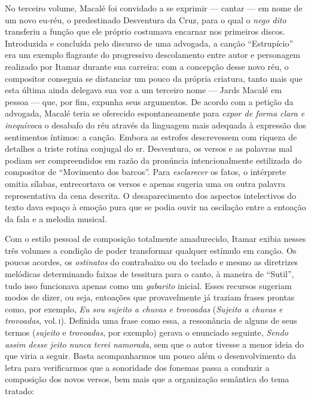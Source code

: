 No terceiro volume, Macalé foi convidado a se exprimir --- cantar --- em nome
de um novo eu-réu, o predestinado Desventura da Cruz, para o qual o \textit{nego
dito} transferiu a função que ele próprio costumava encarnar nos
primeiros discos. Introduzida e concluída pelo discurso de uma advogada,
a canção ``Estrupício'' era um exemplo flagrante do progressivo descolamento
entre autor e personagem realizado por Itamar durante sua carreira: com
a concepção desse novo réu, o compositor conseguia se distanciar um
pouco da própria criatura, tanto mais que esta última ainda delegava sua
voz a um terceiro nome --- Jards Macalé em pessoa --- que, por fim, expunha
seus argumentos. De acordo com a petição da advogada, Macalé teria se
oferecido espontaneamente para \textit{expor de forma clara e inequívoca} o
desabafo do réu através da linguagem mais adequada à expressão dos
sentimentos íntimos: a canção. Embora as estrofes descrevessem com
riqueza de detalhes a triste rotina conjugal do sr. Desventura, os
versos e as palavras mal podiam ser compreendidos em razão da pronúncia
intencionalmente estilizada do compositor de ``Movimento dos barcos''. Para
\textit{esclarecer} os fatos, o intérprete omitia sílabas, entrecortava os
versos e apenas sugeria uma ou outra palavra representativa da cena
descrita. O desaparecimento dos aspectos intelectivos do texto dava
espaço à emoção pura que se podia ouvir na oscilação entre a entoação da
fala e a melodia musical.

Com o estilo pessoal de composição totalmente amadurecido, Itamar exibia
nesses três volumes a condição de poder transformar qualquer estímulo em
canção. Os poucos acordes, os \textit{ostinatos} do contrabaixo ou do teclado e
mesmo as diretrizes melódicas determinando faixas de tessitura para o
canto, à maneira de ``Sutil'', tudo isso funcionava apenas como um
\textit{gabarito} inicial. Esses recursos sugeriam modos de dizer, ou seja,
entoações que provavelmente já traziam frases prontas como, por exemplo,
\textit{Eu sou sujeito a chuvas e trovoadas} (\textit{Sujeito a chuvas e trovoadas},
vol.\,\textsc{i}). Definida uma frase como essa, a ressonância de alguns de seus
termos (\textit{sujeito} e \textit{trovoadas}, por exemplo) gerava o enunciado
seguinte, \textit{Sendo assim desse jeito nunca terei namorada}, sem que o
autor tivesse a menor ideia do que viria a seguir. Basta acompanharmos
um pouco além o desenvolvimento da letra para verificarmos que a
sonoridade dos fonemas passa a conduzir a composição dos novos versos,
bem mais que a organização semântica do tema tratado:

